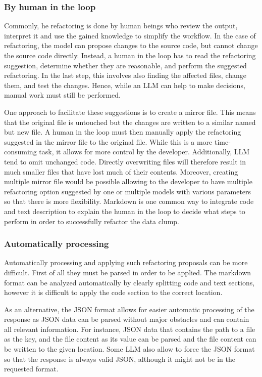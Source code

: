 \subsubsection{By human in the loop}
Commonly, he refactoring is done by human beings who review the output, interpret it and use the gained knowledge to simplify the workflow. In the case of refactoring, the model can propose changes to the source code, but cannot change the source code directly. Instead, a human in the loop has to read the refactoring suggestion, determine whether they are reasonable, and perform the suggested refactoring. In the last step, this involves also finding the affected files, change them, and test the changes. Hence, while an \ac{LLM} can help to make decisions, manual work must still be performed. 

One approach to facilitate these suggestions is to create a mirror file. This means that the original file is untouched but the changes are written to a similar named but new file. A human in the loop must then manually apply the refactoring suggested in the mirror file to the original file. While this is a more time-consuming task, it allows for more control by the developer. Additionally, \acs{LLM} tend to omit unchanged code. Directly overwriting files will therefore result in much smaller files that have lost much of their contents. Moreover, creating multiple mirror file would be possible allowing to the developer to have multiple refactoring option suggested by one or multiple models with various parameters so that there is more flexibility. 
Markdown is one common way to integrate code and text description to explain the human in the loop to decide what steps to perform in order to successfully refactor the data clump.  

\subsubsection{Automatically processing}

Automatically processing and applying such refactoring proposals can be more difficult.
First of all they must be parsed in order to be applied. The markdown format can be analyzed automatically by clearly splitting code and text sections, however it is difficult to apply the code section to the correct location. 

As an alternative, the \ac{JSON} format allows for easier automatic processing of the response as \ac{JSON} data can be parsed without major obstacles and can contain all relevant information. For instance, \ac{JSON} data that contains the path to a file as the key, and the file content as its value can be parsed and the file content can be written to the given location. Some \acs{LLM} also allow to force the \ac{JSON} format so that the response is always valid \ac{JSON}, although it might not be in the requested format. 

